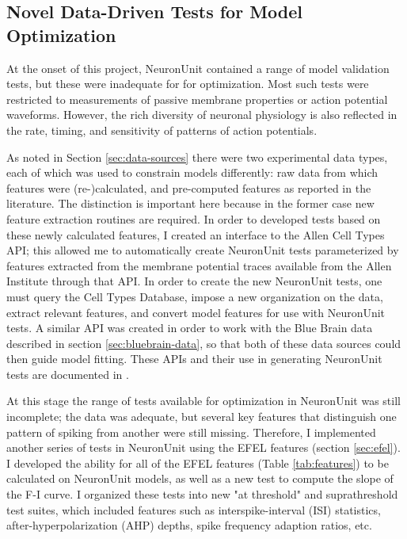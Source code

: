 \subsection{Novel Data-Driven Tests for Model Optimization}
At the onset of this project, NeuronUnit contained a range of model validation tests, but these were inadequate for for optimization.
Most such tests were restricted to measurements of passive membrane properties or action potential waveforms.
However, the rich diversity of neuronal physiology is also reflected in the rate, timing, and sensitivity of patterns of action potentials.

As noted in Section \ref{sec:data-sources} there were two experimental data types, each of which was used to constrain models differently: raw data from which features were (re-)calculated, and pre-computed features as reported in the literature.
The distinction is important here because in the former case new feature extraction routines are required.
In order to developed tests based on these newly calculated features, I created an interface to the Allen Cell Types API; this allowed me to automatically create NeuronUnit tests parameterized by features extracted from the membrane potential traces available from the Allen Institute through that API.
In order to create the new NeuronUnit tests, one must query the Cell Types Database, impose a new organization on the data, extract relevant features, and convert model features for use with NeuronUnit tests.
A similar API was created in order to work with the Blue Brain data described in section \ref{sec:bluebrain-data}, so that both of these data sources could then guide model fitting.
These APIs and their use in generating NeuronUnit tests are documented in \cite{allen-efel-nu-deployed}.

At this stage the range of tests available for optimization in NeuronUnit was still incomplete; the data was adequate, but several key features that distinguish one pattern of spiking from another were still missing. Therefore, I implemented another series of tests in NeuronUnit using the EFEL features \citep{EFEL} (section \ref{sec:efel}).
I developed the ability for all of the EFEL features (Table \ref{tab:features}) to be calculated on NeuronUnit models, as well as a new test to compute the slope of the F-I curve.
I organized these tests into new "at threshold" and suprathreshold test suites, which included features such as
interspike-interval (ISI) statistics, after-hyperpolarization (AHP) depths, spike frequency adaption ratios, etc.

